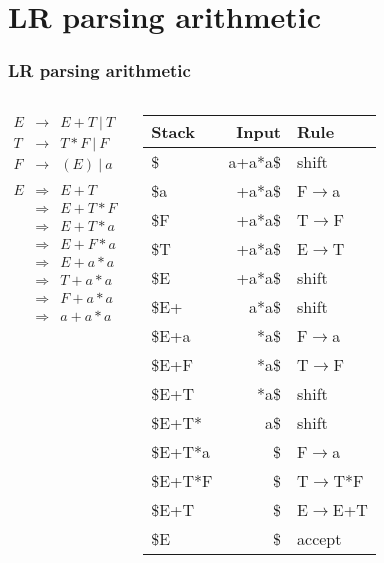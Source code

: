 \documentclass{beamer}
\newcommand{\sect}[1]{
\section{#1}
\begin{frame}[fragile]\frametitle{#1}
}
\newcommand{\myfigt}[1]{\centerline{\texttt{[image: figures/\#1.png]}}}
\newcommand{\arr}{&\rightarrow&}
\newcommand{\darr}{&\Rightarrow&}
\newcommand{\ar}{\ensuremath{\rightarrow}}
\newcommand{\bee}{\begin{eqnarray*}}
\newcommand{\eee}{\end{eqnarray*}}
\begin{document}
\sect{LR parsing arithmetic}
\footnotesize
\begin{columns}
\bee
E \arr E + T \ | \ T\\
T \arr T * F \ | \ F\\
F \arr (E) \ | \ a\\
\\
E \darr 
E+T \\\darr 
E+T*F \\\darr 
E+T*a \\\darr 
E+F*a \\\darr 
E+a*a \\\darr 
T+a*a \\\darr 
F+a*a \\\darr 
a+a*a
\eee

\begin{tabular}{|lr|l|}\hline
Stack & Input & Rule \\\hline
\$ & a+a*a\$ & shift\\
\$a & +a*a\$ & F\ar a\\
\$F & +a*a\$ & T\ar F\\
\$T & +a*a\$ & E\ar T\\
\$E & +a*a\$ & shift\\
\$E+ & a*a\$ & shift\\
\$E+a & *a\$ & F\ar a\\
\$E+F & *a\$ & T\ar F\\
\$E+T & *a\$ & shift\\
\$E+T* & a\$ & shift\\
\$E+T*a & \$ & F\ar a\\
\$E+T*F & \$ & T\ar T*F\\
\$E+T & \$ & E\ar E+T\\
\$E & \$ &    accept\\\hline
\end{tabular}


\end{columns}

\end{frame}
\end{document}

